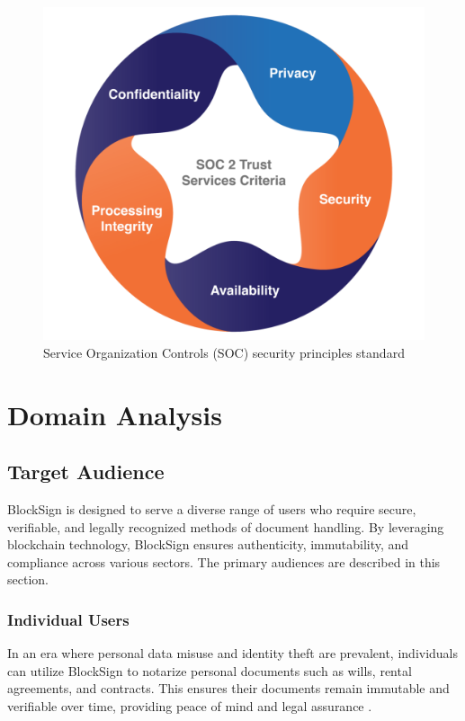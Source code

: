 \begin{figure}[H]
    \centering
    \includegraphics[width=18cm]{"images/soc-compliance-standards.png"}
    \caption{Service Organization Controls (SOC) security principles standard}
    \label{soc-compliance-standards}
\end{figure}


\chapter{Domain Analysis}
\section{Target Audience}
BlockSign is designed to serve a diverse range of users who require secure, verifiable, and legally recognized methods of document handling. By leveraging blockchain technology, BlockSign ensures authenticity, immutability, and compliance across various sectors. The primary audiences are described in this section.

\subsection{Individual Users}
In an era where personal data misuse and identity theft are prevalent, individuals can utilize BlockSign to notarize personal documents such as wills, rental agreements, and contracts. This ensures their documents remain immutable and verifiable over time, providing peace of mind and legal assurance \cite{world_economic_forum_global_nodate}.

